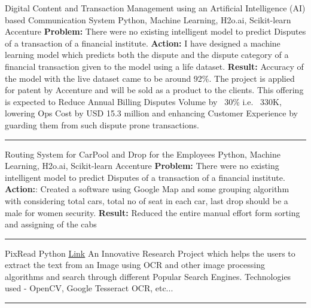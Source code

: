 \begin{cventries}
	\cventry
	{}
	{Digital Content and Transaction Management using an Artificial Intelligence (AI) based Communication System}
	{Python, Machine Learning, H2o.ai, Scikit-learn}
	{Accenture}
	{\textbf{Problem:} There were no existing intelligent model to predict Disputes of a transaction of a financial institute.\newline
		\textbf{Action:} I have designed a machine learning model which predicts both the dispute and the dispute category of a financial transaction given to the model using a life dataset.\newline
		\textbf{Result:} Accuracy of the model with the live dataset came to be around 92\%. The project is applied for patent by Accenture and will be sold as a product to the clients. This offering is expected to Reduce Annual Billing Disputes Volume by ~30\% i.e. ~330K, lowering Ops Cost by USD 15.3 million and enhancing Customer Experience by guarding them from such dispute prone transactions.
	}

	\begin{center}
		\rule{30mm}{.1mm}
	\end{center}

	\cventry
	{}
	{Routing System for CarPool and Drop for the Employees}
	{Python, Machine Learning, H2o.ai, Scikit-learn}
	{Accenture}
	{\textbf{Problem:} There were no existing intelligent model to predict Disputes of a transaction of a financial institute.\newline
		\textbf{Action:}: Created a software using Google Map and some grouping algorithm with considering total cars, total no of seat in each car, last drop should be a male for women security.\newline
		\textbf{Result:} Reduced the entire manual effort form sorting and assigning of the cabs
	}

	\begin{center}
		\rule{30mm}{.1mm}
	\end{center}

	\cventry
	{}
	{PixRead}
	{Python}
	{\href{https://github.com/rehanguha/pixread}{\faLink Link}}
	{An Innovative Research Project which helps the users to extract the text from an Image using OCR and other image processing algorithms and search through different Popular Search Engines. Technologies used - OpenCV, Google Tesseract OCR, etc...}

	\begin{center}
		\rule{30mm}{.1mm}
	\end{center}


\end{cventries}
